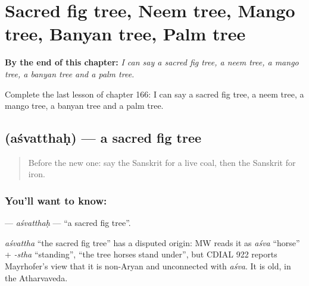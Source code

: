 
\chapter{Sacred fig tree, Neem tree, Mango tree, Banyan tree, Palm tree}
\label{ch:sa-sacred-fig-tree-neem-tree-mango-tree-banyan-tree-palm-tree}

\begin{chapteropening}
\textbf{By the end of this chapter:} \emph{I can say a sacred fig tree, a neem tree, a mango tree, a banyan tree and a palm tree.}

Complete the last lesson of chapter 166: I can say a sacred fig tree, a neem tree, a mango tree, a banyan tree and a palm tree.
\end{chapteropening}

\section[\texorpdfstring{\sk{अश्वत्थः} (aśvatthaḥ)}{अश्वत्थः (aśvatthaḥ)}]{ (aśvatthaḥ) — a sacred fig tree}

\label{lesson:SA-C166-asvatthah}



\begin{quote}
Before the new one: say the Sanskrit for a live coal, then the Sanskrit for iron.
\end{quote}

\subsection*{You'll want to know: }
\textbf{} — \emph{aśvatthaḥ} — \textquotedblleft{}a sacred fig tree\textquotedblright{}.

\begin{cousinweb}
\emph{aśvattha} \textquotedblleft{}the sacred fig tree\textquotedblright{} has a disputed origin: MW reads it as \emph{aśva} \textquotedblleft{}horse\textquotedblright{} + \emph{-stha} \textquotedblleft{}standing\textquotedblright{}, \textquotedblleft{}the tree horses stand under\textquotedblright{}, but CDIAL 922 reports Mayrhofer's view that it is non-Aryan and unconnected with \emph{aśva}. It is old, in the Atharvaveda.
\end{cousinweb}

